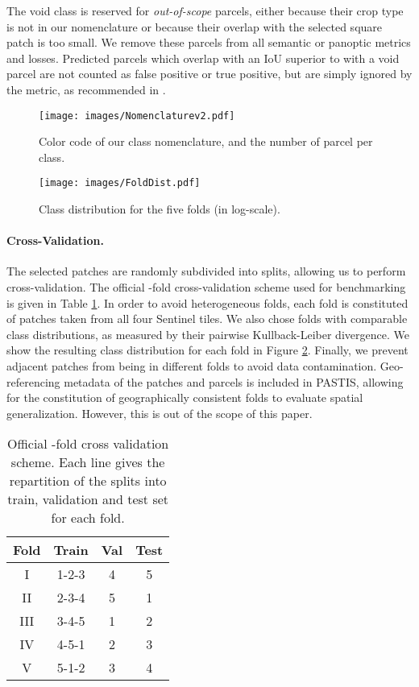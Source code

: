 The void class is reserved for \emph{out-of-scope} parcels, either because their crop type is not in our nomenclature or because their overlap with the selected square patch is too small. We remove these parcels from all semantic or panoptic metrics and losses. Predicted parcels which overlap with an IoU superior to  with a void parcel are not counted as false positive or true positive, but are simply ignored by the metric, as recommended in \cite{kirillov2019panoptic}.

\begin{figure}
    \centering
    \texttt{[image: images/Nomenclaturev2.pdf]}
    \caption{Color code of our class nomenclature, and the number of parcel per class.}
    \label{fig:nomenc}
\end{figure}



\begin{figure}[ht!]
    \centering
    \texttt{[image: images/FoldDist.pdf]}
    \caption{Class distribution for the five folds (in log-scale).}
    \label{fig:class_counts}
\end{figure}

\paragraph{Cross-Validation.} The  selected patches are randomly subdivided into  splits, allowing us to perform cross-validation. The official -fold cross-validation scheme used for benchmarking is given in Table \ref{tab:cv}.
In order to avoid heterogeneous folds, 
each fold is constituted of patches taken from all four Sentinel tiles.
We also chose folds with comparable class distributions, as measured by their pairwise Kullback-Leiber divergence. We show the resulting class distribution for each fold in Figure \ref{fig:class_counts}. 
Finally, we prevent adjacent patches from being in different folds to avoid data contamination.
Geo-referencing metadata of the patches and parcels is included in PASTIS, allowing for the constitution of geographically consistent folds to evaluate spatial generalization. However, this is out of the scope of this paper.
\begin{table}[h]
    \centering
    \begin{tabular}{c|ccc}
       Fold  & Train & Val & Test  \\\midrule
        I &1-2-3 & 4 & 5\\
        II &2-3-4 & 5 & 1\\
        III &3-4-5 & 1 & 2\\
        IV &4-5-1 & 2 & 3\\
        V &5-1-2 & 3 & 4\\    \end{tabular}
    \caption{Official -fold cross validation scheme. Each line gives the repartition of the splits into train, validation and test set for each fold. }
    \label{tab:cv}
\end{table}


